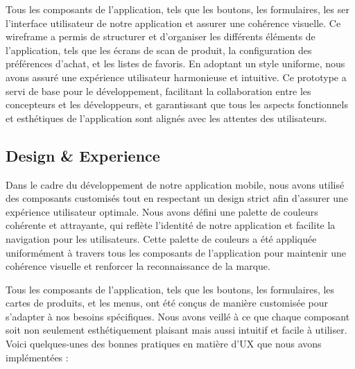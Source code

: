 Tous les composants de l'application, tels que les boutons, les formulaires, les ser l'interface utilisateur de notre application et assurer une cohérence visuelle. Ce wireframe a permis de structurer et d'organiser les différents éléments de l'application, tels que les écrans de scan de produit, la configuration des préférences d'achat, et les listes de favoris. En adoptant un style uniforme, nous avons assuré une expérience utilisateur harmonieuse et intuitive. Ce prototype a servi de base pour le développement, facilitant la collaboration entre les concepteurs et les développeurs, et garantissant que tous les aspects fonctionnels et esthétiques de l'application sont alignés avec les attentes des utilisateurs.

\subsection{Design \& Experience}

Dans le cadre du développement de notre application mobile, nous avons utilisé des composants customisés tout en respectant un design strict afin d'assurer une expérience utilisateur optimale. Nous avons défini une palette de couleurs cohérente et attrayante, qui reflète l'identité de notre application et facilite la navigation pour les utilisateurs. Cette palette de couleurs a été appliquée uniformément à travers tous les composants de l'application pour maintenir une cohérence visuelle et renforcer la reconnaissance de la marque.

Tous les composants de l'application, tels que les boutons, les formulaires, les cartes de produits, et les menus, ont été conçus de manière customisée pour s'adapter à nos besoins spécifiques. Nous avons veillé à ce que chaque composant soit non seulement esthétiquement plaisant mais aussi intuitif et facile à utiliser. Voici quelques-unes des bonnes pratiques en matière d'UX que nous avons implémentées :

